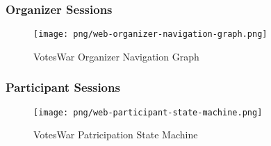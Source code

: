\subsubsection{Organizer Sessions}

\begin{figure}[h]
\centering
\texttt{[image: png/web-organizer-navigation-graph.png]}
\caption{VotesWar Organizer Navigation Graph}
\label{figure:web-organizer-navigation-graph}
\end{figure}

\subsubsection{Participant Sessions}
\begin{figure}[h]
\centering
\texttt{[image: png/web-participant-state-machine.png]}
\caption{VotesWar Patricipation State Machine}
\label{figure:web-participation-state-machine}
\end{figure}




